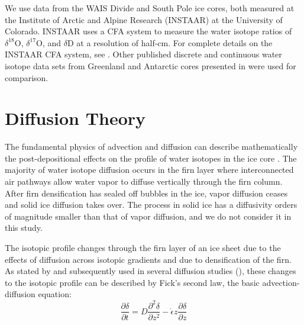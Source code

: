 \documentclass[draft, jgrga]{AGUTeX}
\begin{document}
\begin{article}
We use data from the WAIS Divide and South Pole ice cores, both measured at the Institute of Arctic and Alpine Research (INSTAAR) at the University of Colorado. INSTAAR uses a CFA system to measure the water isotope ratios of $\delta^{18}\mathrm{O}$, $\delta^{17}\mathrm{O}$, and $\delta\mathrm{D}$ at a resolution of half-cm. For complete details on the INSTAAR CFA system, see \citet{Jones2017b}. Other published discrete and continuous water isotope data sets from Greenland and Antarctic cores presented in \citet{Oerter2004,Gkinis2011a,Steig2013,Svensson2015,Holme2017} were used for comparison.


\section{Diffusion Theory}

The fundamental physics of advection and diffusion can describe mathematically the post-depositional effects on the profile of water isotopes in the ice core \citep{Johnsen1977}. The majority of water isotope diffusion occurs in the firn layer where interconnected air pathways allow water vapor to diffuse vertically through the firn column. After firn densification has sealed off bubbles in the ice, vapor diffusion ceases and solid ice diffusion takes over. The process in solid ice has a diffusivity orders of magnitude smaller than that of vapor diffusion, and we do not consider it in this study.

The isotopic profile changes through the firn layer of an ice sheet due to the effects of diffusion across isotopic gradients and due to densification of the firn. As stated by \citet{Johnsen1977} and subsequently used in several diffusion studies (\citep{Johnsen2000, Simonsen2011, Gkinis2014, vanderWel2015, Jones2017a, Holme2017}), these changes to the isotopic profile can be described by Fick's second law, the basic advection-diffusion equation:
\begin{equation}
\frac{\partial \delta}{\partial t}
= D \frac{\partial ^2 \delta}{\partial z^2}
- \dot{\epsilon}
z \frac{\partial \delta}{\partial z}
\end{equation}


\end{article}
\end{document}
